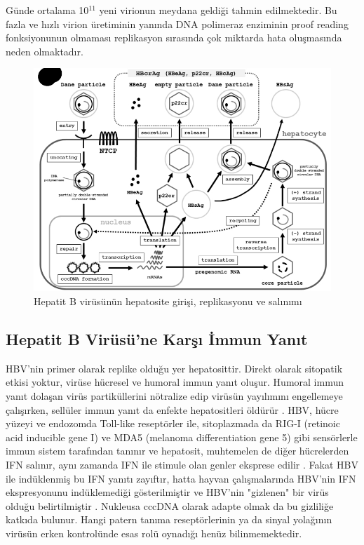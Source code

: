 Günde ortalama 10$ ^{11} $ yeni virionun meydana geldiği tahmin edilmektedir. Bu fazla ve hızlı virion üretiminin yanında DNA polimeraz enziminin proof reading fonksiyonunun olmaması replikasyon sırasında çok miktarda hata oluşmasında neden olmaktadır. 

\bigskip

\begin{figure}[tbph]
\centering
\includegraphics[width=0.9\linewidth]{../Figures/hbventry}
\caption[Hepatit B virüsünün hepatosite girişi, replikasyonu ve salınımı]{Hepatit B virüsünün hepatosite girişi, replikasyonu ve salınımı \cite{inoue2016hepatitis}}
\label{fig:hbventry}
\end{figure}


\subsection{Hepatit B Virüsü'ne Karşı İmmun Yanıt}

HBV’nin primer olarak replike olduğu yer hepatosittir. Direkt olarak sitopatik etkisi yoktur, virüse hücresel ve humoral immun yanıt oluşur. Humoral immun yanıt dolaşan virüs partiküllerini nötralize edip virüsün yayılımını engellemeye çalışırken, sellüler immun yanıt da enfekte hepatositleri öldürür \cite{chisari2010pathogenesis}. HBV, hücre yüzeyi ve endozomda Toll-like reseptörler ile, sitoplazmada da RIG-I (retinoic acid inducible gene I) ve MDA5 (melanoma differentiation gene 5) gibi sensörlerle immun sistem tarafından tanınır ve hepatosit, muhtemelen de diğer hücrelerden IFN salınır, aynı zamanda IFN ile stimule olan genler eksprese edilir \cite{sato2015rna,boeijen2017hepatitis}. Fakat HBV ile indüklenmiş bu IFN yanıtı zayıftır, hatta hayvan çalışmalarında HBV'nin IFN ekspresyonunu indüklemediği gösterilmiştir ve HBV'nin "gizlenen" bir virüs olduğu belirtilmiştir \cite{wieland2005stealth,wieland2004genomic}. Nukleusa cccDNA olarak adapte olmak da bu gizliliğe katkıda bulunur. Hangi patern tanıma reseptörlerinin ya da sinyal yolağının virüsün erken kontrolünde esas rolü oynadığı henüz bilinmemektedir.

